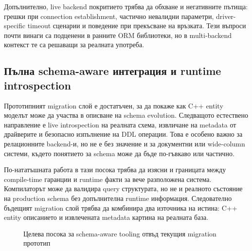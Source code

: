 Допълнително, live backend покритието трябва да обхване и негативните пътища: грешки при connection establishment, частично невалидни параметри, driver-specific timeout сценарии и поведение при прекъсване на връзката. Тези въпроси почти винаги са подценени в ранните ORM библиотеки, но в multi-backend контекст те са решаващи за реалната употреба.

\subsection{Пълна schema-aware интеграция и runtime introspection}

Прототипният migration слой е достатъчен, за да покаже как C++ entity моделът може да участва в описване на schema evolution. Следващото естествено направление е live introspection на реалната схема, извличане на metadata от драйверите и безопасно изпълнение на DDL операции. Това е особено важно за релационните backend-и, но не е без значение и за документни или wide-column системи, където понятието за schema може да бъде по-гъвкаво или частично.

По-нататъшната работа в тази посока трябва да изясни и границата между compile-time гаранции и runtime факти за вече разположена система. Компилаторът може да валидира query структурата, но не и реалното състояние на production schema без допълнителна runtime информация. Следователно бъдещият migration слой трябва да комбинира два източника на истина: C++ entity описанието и извлечената metadata картина на реалната база.

\begin{figure}[H]
\centering
{}
\caption{Целева посока за schema-aware tooling отвъд текущия migration прототип}
\label{fig:future_schema_tooling}
\end{figure}

